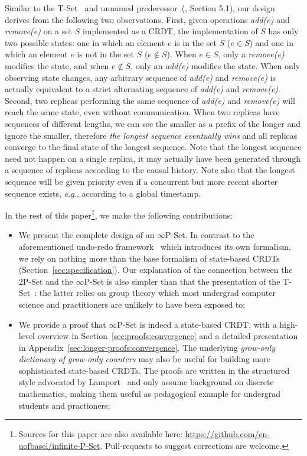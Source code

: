 \documentclass[10pt, oneside]{article}   	%
\begin{document}
Similar to the T-Set~\cite{Dolan2020undoable} and unnamed predecessor~(\cite{Yu2019undo}, Section 5.1), our design derives from the following two observations. First, given operations \textit{add(e)} and \textit{remove(e)} on a set $S$ implemented as a CRDT, the implementation of $S$ has only two possible states: one in which an element $e$ is in the set $S$ ($e \in S$) and one in which an element $e$ is not in the set $S$ ($e \notin S$). When $e \in S$, only a \textit{remove(e)} modifies the state, and when $e \notin S$, only an \textit{add(e)} modifies the state. When only observing state changes, any arbitrary sequence of \textit{add(e)} and \textit{remove(e)} is actually equivalent to a strict alternating sequence of \textit{add(e)} and \textit{remove(e)}. Second, two replicas performing the same sequence of \textit{add(e)} and \textit{remove(e)} will reach the same state, even without communication. When two replicas have sequences of different lengths, we can see the smaller as a prefix of the longer and ignore the smaller, therefore \textit{the longest sequence eventually wins} and all replicas converge to the final state of the longest sequence. Note that the longest sequence need not happen on a single replica, it may actually have been generated through a sequence of replicas according to the causal history. Note also that the longest sequence will be given priority even if a concurrent but more recent shorter sequence exists, \textit{e.g.}, according to a global timestamp.  

In the rest of this paper\footnote{Sources for this paper are also available here: \url{https://github.com/cn-uofbasel/infinite-P-Set}. Pull-requests to suggest corrections are welcome.}, we make the following contributions:
\begin{itemize}
	\item We present the complete design of an $\infty$P-Set. In contrast to the aforementioned undo-redo framework~\cite{Yu2019undo} which introduces its own formalism, we rely on nothing more than the base formalism of state-based CRDTs (Section~\ref{sec:specification}). Our explanation of the connection between the 2P-Set and the $\infty$P-Set is also simpler than that the presentation of the T-Set~\cite{Dolan2020undoable}: the latter relies on group theory which most undergrad computer science and practitioners are unlikely to have been exposed to;
	\item We provide a proof that $\infty$P-Set is indeed a state-based CRDT, with a high-level overview in Section~\ref{sec:proofs:convergence} and a detailed presentation in Appendix~\ref{sec:longer-proofs:convergence}. The underlying \textit{grow-only dictionary of grow-only counters} may also be useful for building more sophisticated state-based CRDTs. The proofs are written in the structured style advocated by Lamport~\cite{lamport2012write} and only assume background on discrete mathematics, making them useful as pedagogical example for undergrad students and practioners;
\end{itemize}
\end{document}
